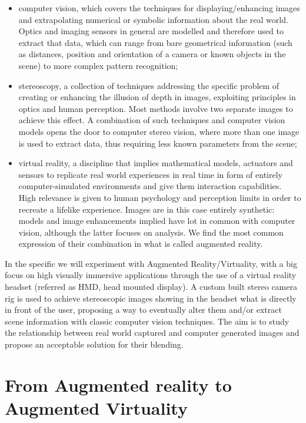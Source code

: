 \begin{itemize}
\item computer vision, which covers the techniques for displaying/enhancing images and extrapolating numerical or symbolic information about the real world. Optics and imaging sensors in general are modelled and therefore used to extract that data, which can range from bare geometrical information (such as distances, position and orientation of a camera or known objects in the scene) to more complex pattern recognition;
\item stereoscopy, a collection of techniques addressing the specific problem of creating or enhancing the illusion of depth in images, exploiting principles in optics and human perception. Most methods involve two separate images to achieve this effect. A combination of such techniques and computer vision models opens the door to computer stereo vision, where more than one image is used to extract data, thus requiring less known parameters from the scene;
\item virtual reality, a discipline that implies mathematical models, actuators and sensors to replicate real world experiences in real time in form of entirely computer-simulated environments and give them interaction capabilities. High relevance is given to human psychology and perception limits in order to recreate a lifelike experience. Images are in this case entirely synthetic: models and image enhancements implied have lot in common with computer vision, although the latter focuses on analysis. We find the most common expression of their combination in what is called augmented reality.
\end{itemize}
In the specific we will experiment with Augmented Reality/Virtuality, with a big focus on high visually immersive applications through the use of a virtual reality headset (referred as HMD, head mounted display). A custom built stereo camera rig is used to achieve stereoscopic images showing in the headset what is directly in front of the user, proposing a way to eventually alter them and/or extract scene information with classic computer vision techniques. The aim is to study the relationship between real world captured and computer generated images and propose an acceptable solution for their blending.

\section{From Augmented reality to Augmented Virtuality}


